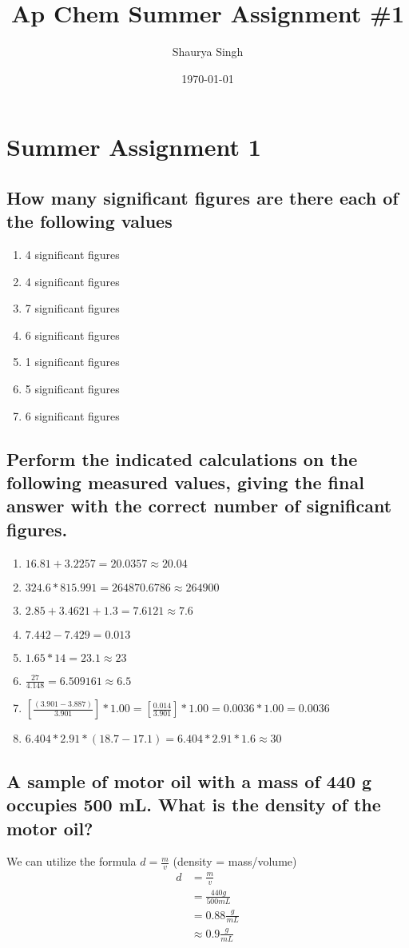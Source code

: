 \documentclass[11pt]{article}
\author{Shaurya Singh}
\date{\today}
\title{Ap Chem Summer Assignment \#1}
\begin{document}
\maketitle

\section{Summer Assignment 1}
\label{sec:orgb6860af}
\subsection{How many significant figures are there each of the following values}
\label{sec:org57c8cdf}
\begin{enumerate}
\item 4 significant figures
\item 4 significant figures
\item 7 significant figures
\item 6 significant figures
\item 1 significant figures
\item 5 significant figures
\item 6 significant figures
\end{enumerate}

\subsection{Perform the indicated calculations on the following measured values, giving the final answer with the correct number of significant figures.}
\label{sec:org5bf841e}
\begin{enumerate}
\item \(16.81 + 3.2257 = 20.0357 \approx 20.04\)
\item \(324.6 * 815.991 = 264870.6786 \approx 264900\)
\item \(2.85 + 3.4621 + 1.3 = 7.6121 \approx 7.6\)
\item \(7.442 - 7.429 = 0.013\)
\item \(1.65 * 14 = 23.1 \approx 23\)
\item \(\frac{27}{4.148} = 6.509161 \approx 6.5\)
\item \([\frac{(3.901 - 3.887)}{3.901}] * 1.00 = [\frac{0.014}{3.901}] * 1.00 = 0.0036 * 1.00 = 0.0036\)
\item \(6.404 * 2.91 * (18.7 - 17.1) = 6.404 * 2.91 * 1.6 \approx 30\)
\end{enumerate}

\subsection{A sample of motor oil with a mass of 440 g occupies 500 mL. What is the density of the motor oil?}
\label{sec:org6796d25}
We can utilize the formula \(d=\frac{m}{v}\) (density = mass/volume)
\begin{align*}
d&=\frac{m}{v}\\
&=\frac{440g}{500mL}\\
&=0.88\frac{g}{mL}\\
&\approx0.9\frac{g}{mL}
\end{align*}
\end{document}
